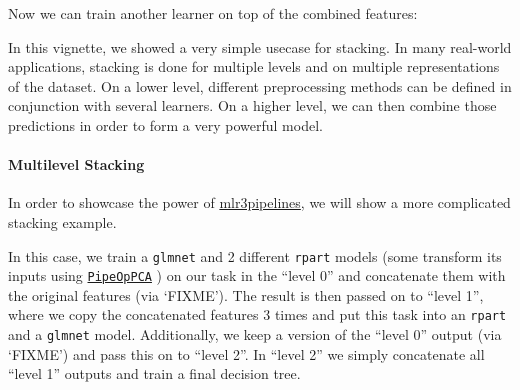 \documentclass[]{article}
\newenvironment{Shaded}{}{}
\newcommand{\CommentTok}[1]{\textcolor[rgb]{0.00,0.50,0.00}{#1}}
\newcommand{\DataTypeTok}[1]{#1}
\newcommand{\KeywordTok}[1]{\textcolor[rgb]{0.00,0.00,1.00}{#1}}
\newcommand{\NormalTok}[1]{#1}
\newcommand{\OperatorTok}[1]{#1}
\newcommand{\OtherTok}[1]{\textcolor[rgb]{1.00,0.25,0.00}{#1}}
\newcommand{\StringTok}[1]{\textcolor[rgb]{0.00,0.50,0.50}{#1}}
\let\oldparagraph\paragraph
\renewcommand{\paragraph}[1]{\oldparagraph{#1}\mbox{}}
\renewenvironment{Shaded} {\begin{snugshade}\small} {\end{snugshade}}
\begin{document}
Now we can train another learner on top of the combined features:

\begin{Shaded}
\end{Shaded}

\begin{Shaded}
\end{Shaded}

In this vignette, we showed a very simple usecase for stacking.
In many real-world applications, stacking is done for multiple levels and on multiple representations of the dataset.
On a lower level, different preprocessing methods can be defined in conjunction with several learners.
On a higher level, we can then combine those predictions in order to form a very powerful model.

\hypertarget{multilevel-stacking}{%
\paragraph{Multilevel Stacking}\label{multilevel-stacking}}

In order to showcase the power of \href{https://mlr3pipelines.mlr-org.com}{mlr3pipelines}, we will show a more complicated stacking example.

In this case, we train a \texttt{glmnet} and 2 different \texttt{rpart} models (some transform its inputs using \href{https://mlr3pipelines.mlr-org.com/reference/mlr_pipeops_pca.html}{\texttt{PipeOpPCA}} ) on our task in the ``level 0'' and concatenate them with the original features (via `FIXME').
The result is then passed on to ``level 1'', where we copy the concatenated features 3 times and put this task into an \texttt{rpart} and a \texttt{glmnet} model.
Additionally, we keep a version of the ``level 0'' output (via `FIXME') and pass this on to ``level 2''.
In ``level 2'' we simply concatenate all ``level 1'' outputs and train a final decision tree.
\end{document}
